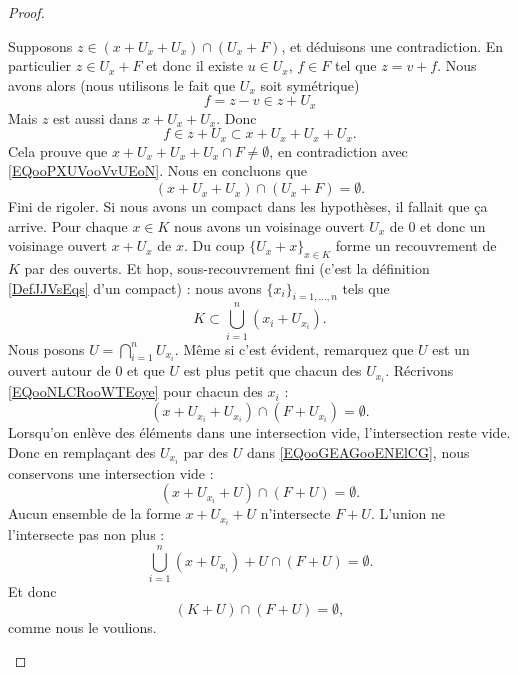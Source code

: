 \begin{proof}
\begin{subproof}
		\spitem[\( (x+U_x+U_x)\cap (U_x+F)=\emptyset\)]
		Supposons \( z\in (x+U_x+U_x)\cap (U_x+F)\), et déduisons une contradiction. En particulier \( z\in U_x+F\) et donc il existe \( u\in U_x\), \( f\in F\) tel que \( z=v+f\). Nous avons alors (nous utilisons le fait que \( U_x\) soit symétrique)
		\begin{equation}
			f=z-v\in z+U_x
		\end{equation}
		Mais \( z\) est aussi dans \( x+U_x+U_x\). Donc
		\begin{equation}
			f\in z+U_x\subset x+U_x+U_x+U_x.
		\end{equation}
		Cela prouve que \( x+U_x+U_x+U_x\cap F\neq \emptyset\), en contradiction avec \eqref{EQooPXUVooVvUEoN}. Nous en concluons que
		\begin{equation}        \label{EQooNLCRooWTEoye}
			(x+U_x+U_x)\cap (U_x+F)=\emptyset.
		\end{equation}
		Fini de rigoler. Si nous avons un compact dans les hypothèses, il fallait que ça arrive. Pour chaque \( x\in K\) nous avons un voisinage ouvert \( U_x\) de \( 0\) et donc un voisinage ouvert \( x+U_x\) de \( x\). Du coup \( \{ U_x+x \}_{x\in K}\) forme un recouvrement de \( K\) par des ouverts. Et hop, sous-recouvrement fini (c'est la définition \ref{DefJJVsEqs} d'un compact) : nous avons \( \{ x_i \}_{i=1,\ldots, n}\) tels que
		\begin{equation}
			K\subset\bigcup_{i=1}^n(x_i+U_{x_i}).
		\end{equation}
		Nous posons \( U=\bigcap_{i=1}^nU_{x_i}\). Même si c'est évident, remarquez que \( U\) est un ouvert autour de \( 0\) et que \( U\) est plus petit que chacun des \( U_{x_i}\). Récrivons \eqref{EQooNLCRooWTEoye} pour chacun des \( x_i\) :
		\begin{equation}        \label{EQooGEAGooENElCG}
			(x+U_{x_i}+U_{x_i})\cap (F+U_{x_i})=\emptyset.
		\end{equation}
		Lorsqu'on enlève des éléments dans une intersection vide, l'intersection reste vide. Donc en remplaçant des \( U_{x_i}\) par des \( U\) dans \eqref{EQooGEAGooENElCG}, nous conservons une intersection vide :
		\begin{equation}
			(x+U_{x_i}+U)\cap (F+U)=\emptyset.
		\end{equation}
		\spitem[Conclusion]
		Aucun ensemble de la forme \( x+U_{x_i}+U\) n'intersecte \( F+U\). L'union ne l'intersecte pas non plus :
		\begin{equation}
			\bigcup_{i=1}^n(x+U_{x_i})+U\cap(F+U)=\emptyset.
		\end{equation}
		Et donc
		\begin{equation}
			(K+U)\cap(F+U)=\emptyset,
		\end{equation}
		comme nous le voulions.
	\end{subproof}
\end{proof}

